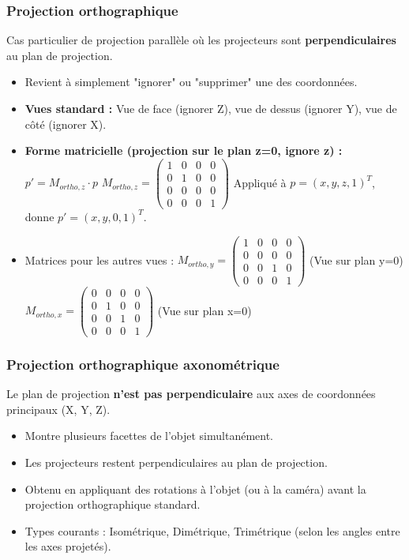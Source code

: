 \documentclass{article}
\begin{document}
\subsubsection{Projection orthographique}
Cas particulier de projection parallèle où les projecteurs sont \textbf{perpendiculaires} au plan de projection.
\begin{itemize}
    \item Revient à simplement "ignorer" ou "supprimer" une des coordonnées.
    \item \textbf{Vues standard :} Vue de face (ignorer Z), vue de dessus (ignorer Y), vue de côté (ignorer X).
    \item \textbf{Forme matricielle (projection sur le plan z=0, ignore z) :}
    $p' = M_{ortho, z} \cdot p$
    $M_{ortho, z} = \begin{pmatrix} 1 & 0 & 0 & 0 \\ 0 & 1 & 0 & 0 \\ 0 & 0 & 0 & 0 \\ 0 & 0 & 0 & 1 \end{pmatrix}$
    Appliqué à $p = (x, y, z, 1)^T$, donne $p' = (x, y, 0, 1)^T$.
    \item Matrices pour les autres vues :
    $M_{ortho, y} = \begin{pmatrix} 1 & 0 & 0 & 0 \\ 0 & 0 & 0 & 0 \\ 0 & 0 & 1 & 0 \\ 0 & 0 & 0 & 1 \end{pmatrix}$ (Vue sur plan y=0)
    $M_{ortho, x} = \begin{pmatrix} 0 & 0 & 0 & 0 \\ 0 & 1 & 0 & 0 \\ 0 & 0 & 1 & 0 \\ 0 & 0 & 0 & 1 \end{pmatrix}$ (Vue sur plan x=0)
\end{itemize}

\subsubsection{Projection orthographique axonométrique}
Le plan de projection \textbf{n'est pas perpendiculaire} aux axes de coordonnées principaux (X, Y, Z).
\begin{itemize}
    \item Montre plusieurs facettes de l'objet simultanément.
    \item Les projecteurs restent perpendiculaires au plan de projection.
    \item Obtenu en appliquant des rotations à l'objet (ou à la caméra) avant la projection orthographique standard.
    \item Types courants : Isométrique, Dimétrique, Trimétrique (selon les angles entre les axes projetés).
\end{itemize}
\end{document}
